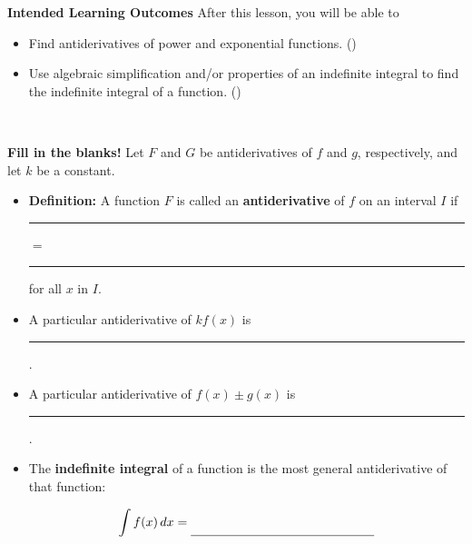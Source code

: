 \documentclass[10pt]{article}
\begin{document}
\pagestyle{otherpages}
\thispagestyle{firstpage}

\textbf{Intended Learning Outcomes}
After this lesson, you will be able to 

\begin{itemize}
    \item Find antiderivatives of power and exponential functions. ()
    \item Use algebraic simplification and/or properties of an indefinite integral to find the indefinite integral of a function. ()
\end{itemize}

\vspace{-0.6cm}

\hrulefill\\

\begin{center}
\end{center}

{\bf\color{blue} Fill in the blanks!} Let $F$ and $G$ be antiderivatives of $f$ and $g$, respectively, and let $k$ be a constant.

\begin{itemize}

\item {\bf Definition:} A function $F$ is called an {\bf antiderivative} of $f$ on an interval $I$ if \rule[-8pt]{0.5in}{0.4pt} $=$ \rule[-8pt]{0.5in}{0.4pt} for all $x$ in $I$.\\

\item A particular antiderivative of $kf(x)$ is \dotfill\rule[-8pt]{1in}{0.4pt}.\\

\item A particular antiderivative of $f(x)\pm g(x)$ is \dotfill\rule[-8pt]{2in}{0.4pt}.\\

\item The {\bf indefinite integral} of a function is the most general antiderivative of that function: 

\[\dint f(x)\,dx = \rule[-8pt]{2in}{0.4pt}\]

\end{itemize}

\
\end{document}
